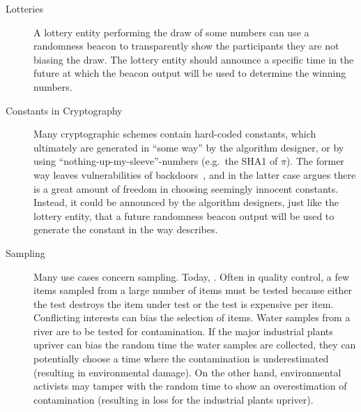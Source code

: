 \begin{description}
    \item[Lotteries] A lottery entity performing the draw of some numbers can use a randomness beacon to transparently show the participants they are not biasing the draw.
    The lottery entity should announce a specific time in the future at which the beacon output will be used to determine the winning numbers.
    \item[Constants in Cryptography] Many cryptographic schemes contain hard-coded constants, which ultimately are generated in \enquote{some way} by the algorithm designer, or by using \enquote{nothing-up-my-sleeve}-numbers (e.g.\ the SHA1 of $\pi$).
    The former way leaves vulnerabilities of backdoors~, and in the latter case  argues there is a great amount of freedom in choosing seemingly innocent constants.
    Instead, it could be announced by the algorithm designers, just like the lottery entity, that a future randomness beacon output will be used to generate the constant in the way  describes.
    \item[Sampling] Many use cases concern sampling. Today, . Often in quality control, a few items sampled from a large number of items must be tested because either the test destroys the item under test or the test is expensive per item. Conflicting interests can bias the selection of items. Water samples from a river are to be tested for contamination. If the major industrial plants upriver can bias the random time the water samples are collected, they can potentially choose a time where the contamination is underestimated (resulting in environmental damage). On the other hand, environmental activists may tamper with the random time to show an overestimation of contamination (resulting in loss for the industrial plants upriver).
\end{description}




